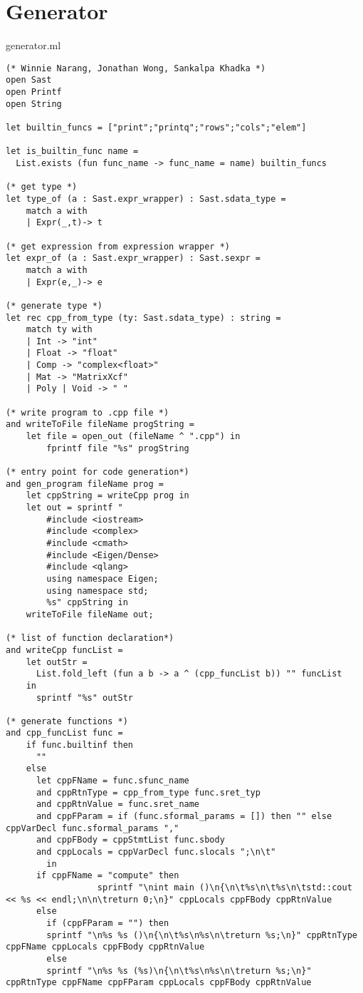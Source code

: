 \section{Generator}
generator.ml
\begin{lstlisting}
(* Winnie Narang, Jonathan Wong, Sankalpa Khadka *)
open Sast
open Printf
open String

let builtin_funcs = ["print";"printq";"rows";"cols";"elem"]

let is_builtin_func name =
  List.exists (fun func_name -> func_name = name) builtin_funcs

(* get type *)
let type_of (a : Sast.expr_wrapper) : Sast.sdata_type =
    match a with
    | Expr(_,t)-> t

(* get expression from expression wrapper *)
let expr_of (a : Sast.expr_wrapper) : Sast.sexpr =
    match a with
    | Expr(e,_)-> e

(* generate type *)
let rec cpp_from_type (ty: Sast.sdata_type) : string =
    match ty with
    | Int -> "int"
    | Float -> "float"
    | Comp -> "complex<float>"
    | Mat -> "MatrixXcf"
    | Poly | Void -> " "

(* write program to .cpp file *)
and writeToFile fileName progString =
    let file = open_out (fileName ^ ".cpp") in
        fprintf file "%s" progString 

(* entry point for code generation*)        
and gen_program fileName prog =
    let cppString = writeCpp prog in
    let out = sprintf "
        #include <iostream>
        #include <complex>
        #include <cmath>
        #include <Eigen/Dense>
        #include <qlang>
        using namespace Eigen;
        using namespace std;
        %s" cppString in 
    writeToFile fileName out;

(* list of function declaration*)    
and writeCpp funcList =
    let outStr =
      List.fold_left (fun a b -> a ^ (cpp_funcList b)) "" funcList
    in
      sprintf "%s" outStr

(* generate functions *)    
and cpp_funcList func =
    if func.builtinf then
      ""
    else
      let cppFName = func.sfunc_name
      and cppRtnType = cpp_from_type func.sret_typ
      and cppRtnValue = func.sret_name
      and cppFParam = if (func.sformal_params = []) then "" else cppVarDecl func.sformal_params ","
      and cppFBody = cppStmtList func.sbody 
      and cppLocals = cppVarDecl func.slocals ";\n\t"
        in
      if cppFName = "compute" then
                  sprintf "\nint main ()\n{\n\t%s\n\t%s\n\tstd::cout << %s << endl;\n\n\treturn 0;\n}" cppLocals cppFBody cppRtnValue
      else 
        if (cppFParam = "") then
        sprintf "\n%s %s ()\n{\n\t%s\n%s\n\treturn %s;\n}" cppRtnType cppFName cppLocals cppFBody cppRtnValue
        else
        sprintf "\n%s %s (%s)\n{\n\t%s\n%s\n\treturn %s;\n}" cppRtnType cppFName cppFParam cppLocals cppFBody cppRtnValue


\end{lstlisting}
